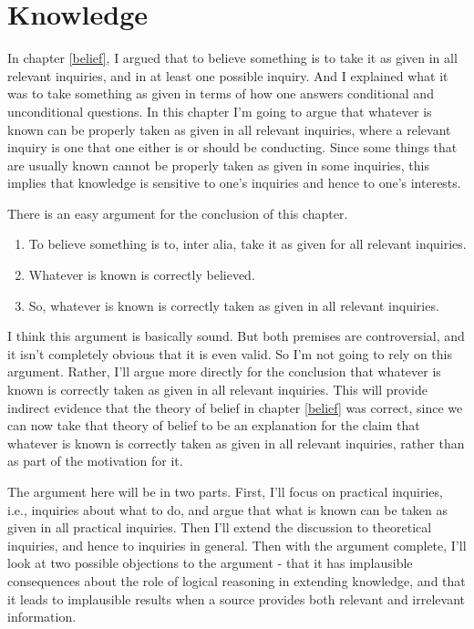 \documentclass[
  11pt,
]{book}
\providecommand{\tightlist}{%
  \setlength{\itemsep}{0pt}\setlength{\parskip}{0pt}}
\begin{document}
\hypertarget{knowledge}{%
\chapter{Knowledge}\label{knowledge}}

In chapter \ref{belief}, I argued that to believe something is to take it as given in all relevant inquiries, and in at least one possible inquiry. And I explained what it was to take something as given in terms of how one answers conditional and unconditional questions. In this chapter I'm going to argue that whatever is known can be properly taken as given in all relevant inquiries, where a relevant inquiry is one that one either is or should be conducting. Since some things that are usually known cannot be properly taken as given in some inquiries, this implies that knowledge is sensitive to one's inquiries and hence to one's interests.

There is an easy argument for the conclusion of this chapter.

\begin{enumerate}
\def\labelenumi{\arabic{enumi}.}
\tightlist
\item
  To believe something is to, inter alia, take it as given for all relevant inquiries.
\item
  Whatever is known is correctly believed.
\item
  So, whatever is known is correctly taken as given in all relevant inquiries.
\end{enumerate}

I think this argument is basically sound. But both premises are controversial, and it isn't completely obvious that it is even valid. So I'm not going to rely on this argument. Rather, I'll argue more directly for the conclusion that whatever is known is correctly taken as given in all relevant inquiries. This will provide indirect evidence that the theory of belief in chapter \ref{belief} was correct, since we can now take that theory of belief to be an explanation for the claim that whatever is known is correctly taken as given in all relevant inquiries, rather than as part of the motivation for it.

The argument here will be in two parts. First, I'll focus on practical inquiries, i.e., inquiries about what to do, and argue that what is known can be taken as given in all practical inquiries. Then I'll extend the discussion to theoretical inquiries, and hence to inquiries in general. Then with the argument complete, I'll look at two possible objections to the argument - that it has implausible consequences about the role of logical reasoning in extending knowledge, and that it leads to implausible results when a source provides both relevant and irrelevant information.
\end{document}
